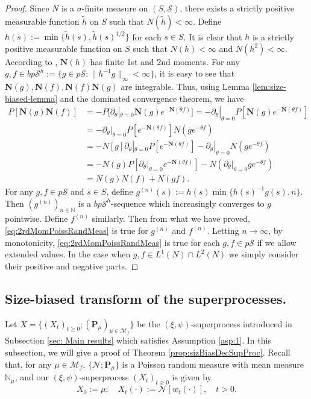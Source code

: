 \documentclass[UTF8]{pkuthss}
\theoremstyle{plain}
\theoremstyle{definition}
\numberwithin{equation}{section}
\begin{document}
\begin{proof}
	Since $N$ is a $\sigma$-finite measure on $(S, \mathscr S)$, there exists a strictly positive measurable function $\tilde h$ on $S$ such that $N(\tilde h)<\infty$.
	Define $h(s) := \min\{ \tilde h(s), \tilde h(s)^{1/2} \}$ for each $s \in S$.
	It is clear that $h$ is a strictly positive measurable function on $S$ such that $N(h) < \infty$ and $N(h^2) < \infty$.
	According to \cite[Theorem 2.7]{Kyprianou2014Fluctuations}, $\mathbf N(h)$ has finite 1st and 2nd moments.
	For any $g, f \in bp\mathscr S^h := \{g \in p\mathscr S: \|h^{-1} g\|_\infty < \infty\}$, it is easy to see that $\mathbf N(g), \mathbf N(f), \mathbf N(f) \mathbf N(g)$ are integrable.
	Thus, using Lemma \ref{lem:size-biased-lemma} and the dominated convergence theorem, we have
\[\begin{split}
	P [\mathbf N(g) \mathbf N(f)]
	&= - P[\partial_\theta|_{\theta = 0} \mathbf N(g) e^{-\mathbf N(\theta f)}]
	= - \partial_\theta|_{\theta = 0} P[\mathbf N(g) e^{-\mathbf N(\theta f)}]\\
	&= - \partial_\theta|_{\theta = 0} P[e^{-\mathbf N(\theta f)}]N(ge^{-\theta f})\\
	&= - N[g] \partial_\theta|_{\theta = 0} P[e^{-\mathbf N(\theta f)}] - \partial_\theta|_{\theta = 0} N(ge^{- \theta f}) \\
	&= - N(g) P[ \partial_\theta|_{\theta = 0} e^{-\mathbf N(\theta f)}] - N( \partial_\theta|_{\theta = 0} g e^{-\theta f}) \\
	&= N(g) N(f) + N(g f).
\end{split}\]
	For any $g,f\in p\mathscr S$ and $s \in S$, define $g^{(n)}(s) := h(s) \min\{h(s)^{-1}g(s),n\}$.
	Then $(g^{(n)})_{n\in \mathbb N}$ is a $bp\mathscr S^h$-sequence which increasingly converges to $g$ pointwise.
	Define $f^{(n)}$ similarly.
	Then from what we have proved, \eqref{eq:2rdMomPoissRandMeas} is true for $g^{(n)}$ and $f^{(n)}$.
	Letting $n\to\infty$, by monotonicity, \eqref{eq:2rdMomPoissRandMeas} is true for each $g,f\in p\mathscr S$ if we allow extended values.
	In the case when $g,f\in L^1(N) \cap L^2(N)$ we simply consider their positive and negative parts.
\end{proof}

\subsection{Size-biased transform of the superprocesses.}
\label{sec: size-biased transform of the superprocesses}
	Let $X=\{(X_t)_{t\geq 0}; (\mathbf P_\mu)_{\mu \in \mathcal M_f}\}$ be the $(\xi,\psi)$-superprocess introduced in Subsection \ref{sec: Main results} which satisfies Assumption \ref{asp:1}.
	In this subsection, we will give a proof of Theorem \ref{prop:sizBiasDecSupProc}.
 Recall that, for any $\mu\in \mathcal M_f$, $\{\mathcal N; \mathbf P_\mu\}$ is a Poisson random measure
	with mean measure $\mathbb N_\mu$,
	and our $(\xi,\psi)$-superprocess $(X_t)_{t\ge 0}$ is  given by
\[
	X_0 := \mu;
	\quad X_t(\cdot)
	:=\mathcal N[w_t(\cdot)],
	\quad t>0.
\]
\end{document}

